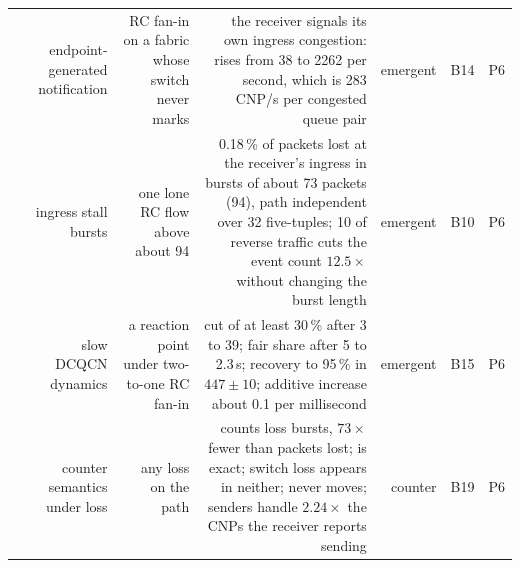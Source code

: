 \begin{table}[t]
\begin{tabular}{@{}l R{0.115} R{0.185} R{0.30} R{0.065} l l@{}}
     & endpoint-generated notification &
    RC fan-in on a fabric whose switch never marks &
    the receiver signals its own ingress congestion:  rises
    from 38 to 2262 per second, which is 283 CNP/s per congested queue pair &
    emergent & B14 & P6 \\

     & ingress stall bursts &
    one lone RC flow above about 94\Gbps{} &
    0.18\,\% of packets lost at the receiver's ingress in bursts of about 73
    packets (94\uS{}), path independent over 32 five-tuples; 10\Gbps{} of
    reverse traffic cuts the event count $12.5\times$ without changing the
    burst length &
    emergent & B10 & P6 \\

     & slow DCQCN dynamics &
    a reaction point under two-to-one RC fan-in &
    cut of at least 30\,\% after 3 to 39\mS{}; fair share after 5\mS{} to
    2.3\,s; recovery to 95\,\% in $447 \pm 10$\mS{}; additive increase about
    0.1\Gbps{} per millisecond &
    emergent & B15 & P6 \\

     & counter semantics under loss &
    any loss on the path &
     counts loss bursts, $73\times$ fewer than packets
    lost;  is exact; switch loss appears in neither;
     never moves; senders handle $2.24\times$ the CNPs the
    receiver reports sending &
    counter & B19 & P6 \\

    \bottomrule
  \end{tabular}
\end{table}
